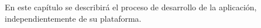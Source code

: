 En este capítulo se describirá el proceso de desarrollo de la aplicación, independientemente de su plataforma.


